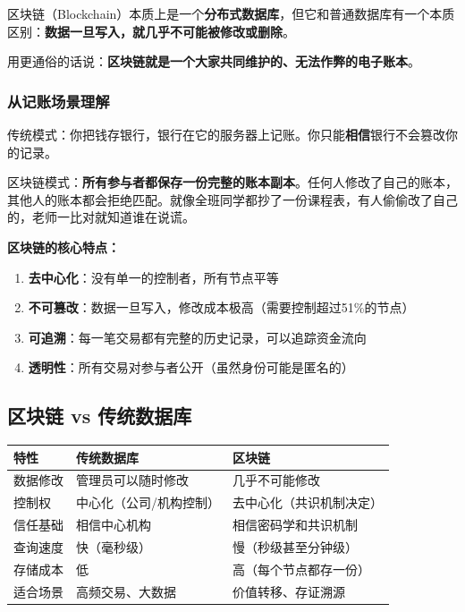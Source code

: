 ﻿\documentclass[12pt,a4paper]{article}
\begin{document}
区块链（Blockchain）本质上是一个\textbf{分布式数据库}，但它和普通数据库有一个本质区别：\textbf{数据一旦写入，就几乎不可能被修改或删除}。

用更通俗的话说：\textbf{区块链就是一个大家共同维护的、无法作弊的电子账本}。

\subsubsection*{从记账场景理解}

传统模式：你把钱存银行，银行在它的服务器上记账。你只能\textbf{相信}银行不会篡改你的记录。

区块链模式：\textbf{所有参与者都保存一份完整的账本副本}。任何人修改了自己的账本，其他人的账本都会拒绝匹配。就像全班同学都抄了一份课程表，有人偷偷改了自己的，老师一比对就知道谁在说谎。

\begin{theorybox}
\textbf{区块链的核心特点：}
\begin{enumerate}
\item \textbf{去中心化}：没有单一的控制者，所有节点平等
\item \textbf{不可篡改}：数据一旦写入，修改成本极高（需要控制超过51\%的节点）
\item \textbf{可追溯}：每一笔交易都有完整的历史记录，可以追踪资金流向
\item \textbf{透明性}：所有交易对参与者公开（虽然身份可能是匿名的）
\end{enumerate}
\end{theorybox}

\subsection{区块链 vs 传统数据库}

\begin{center}
\begin{tabular}{|l|p{5cm}|p{5cm}|}
\hline
\rowcolor{LightBG}
\textbf{特性} & \textbf{传统数据库} & \textbf{区块链} \\
\hline
数据修改 & 管理员可以随时修改 & 几乎不可能修改 \\
\hline
控制权 & 中心化（公司/机构控制） & 去中心化（共识机制决定） \\
\hline
信任基础 & 相信中心机构 & 相信密码学和共识机制 \\
\hline
查询速度 & 快（毫秒级） & 慢（秒级甚至分钟级） \\
\hline
存储成本 & 低 & 高（每个节点都存一份） \\
\hline
适合场景 & 高频交易、大数据 & 价值转移、存证溯源 \\
\hline
\end{tabular}
\end{center}
\end{document}
